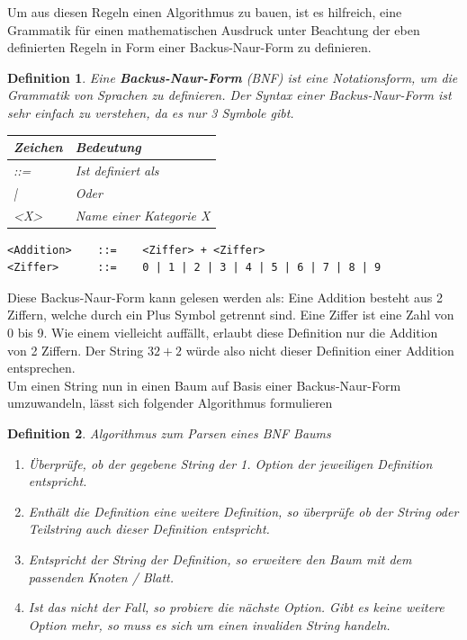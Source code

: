 \documentclass[11pt]{article}
\newtheorem{defin}{Definition}
\begin{document}
Um aus diesen Regeln einen Algorithmus zu bauen, ist es hilfreich, 
eine Grammatik für einen mathematischen Ausdruck unter Beachtung der eben definierten Regeln 
in Form einer Backus-Naur-Form zu definieren. 

\begin{defin}
  Eine \textbf{Backus-Naur-Form} (BNF) ist eine Notationsform, um die Grammatik von Sprachen zu definieren. 
  Der Syntax einer Backus-Naur-Form ist sehr einfach zu verstehen, da es nur 3 Symbole gibt.  

  \begin{table}[h]
  \begin{tabular}{|l|l|}
  \hline
    Zeichen     & Bedeutung               \\ \hline
    ::=         & Ist definiert als       \\ \hline
    |           & Oder                    \\ \hline
    <X>         & Name einer Kategorie X  \\ \hline
  \end{tabular}
  \end{table}
\end{defin}

\begin{verbatim}
<Addition>    ::=    <Ziffer> + <Ziffer>
<Ziffer>      ::=    0 | 1 | 2 | 3 | 4 | 5 | 6 | 7 | 8 | 9 
\end{verbatim}
Diese Backus-Naur-Form kann gelesen werden als: 
Eine Addition besteht aus 2 Ziffern, 
welche durch ein Plus Symbol getrennt sind. 
Eine Ziffer ist eine Zahl von 0 bis 9. 
Wie einem vielleicht auffällt, erlaubt diese Definition nur 
die Addition von 2 Ziffern. Der String $32+2$ würde also nicht 
dieser Definition einer Addition entsprechen. \newline \\
Um einen String nun in einen Baum auf Basis einer Backus-Naur-Form umzuwandeln, 
lässt sich folgender Algorithmus formulieren

\begin{defin}
  Algorithmus zum Parsen eines BNF Baums
  \begin{enumerate}
    \item Überprüfe, ob der gegebene String der 1. Option der jeweiligen Definition entspricht.
    \item Enthält die Definition eine weitere Definition, so überprüfe ob der String oder Teilstring auch dieser Definition entspricht.
    \item Entspricht der String der Definition, so erweitere den Baum mit dem passenden Knoten / Blatt.
    \item Ist das nicht der Fall, so probiere die nächste Option. Gibt es keine weitere Option mehr, so muss es sich um einen invaliden String handeln.
  \end{enumerate}
\end{defin}
\end{document}
